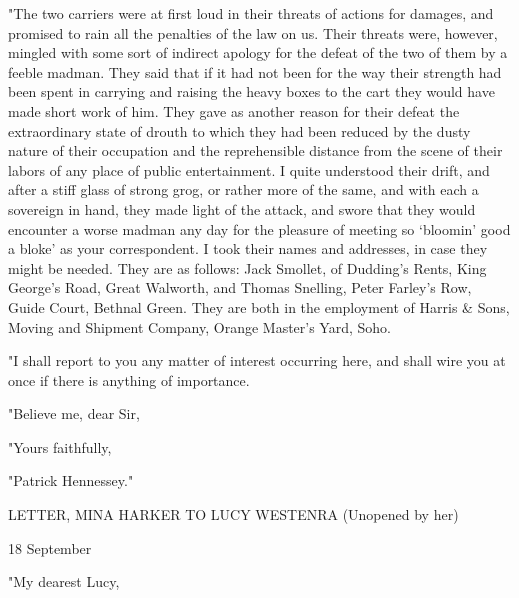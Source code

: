 "The two carriers were at first loud in their threats of actions for damages, and promised to rain all the penalties of the law on us. Their threats were, however, mingled with some sort of indirect apology for the defeat of the two of them by a feeble madman. They said that if it had not been for the way their strength had been spent in carrying and raising the heavy boxes to the cart they would have made short work of him. They gave as another reason for their defeat the extraordinary state of drouth to which they had been reduced by the dusty nature of their occupation and the reprehensible distance from the scene of their labors of any place of public entertainment. I quite understood their drift, and after a stiff glass of strong grog, or rather more of the same, and with each a sovereign in hand, they made light of the attack, and swore that they would encounter a worse madman any day for the pleasure of meeting so `bloomin' good a bloke' as your correspondent. I took their names and addresses, in case they might be needed. They are as follows: Jack Smollet, of Dudding's Rents, King George's Road, Great Walworth, and Thomas Snelling, Peter Farley's Row, Guide Court, Bethnal Green. They are both in the employment of Harris \& Sons, Moving and Shipment Company, Orange Master's Yard, Soho. 

"I shall report to you any matter of interest occurring here, and shall wire you at once if there is anything of importance. 

"Believe me, dear Sir, 

"Yours faithfully, 

"Patrick Hennessey." 

LETTER, MINA HARKER TO LUCY WESTENRA (Unopened by her) 

18 September 

"My dearest Lucy, 

